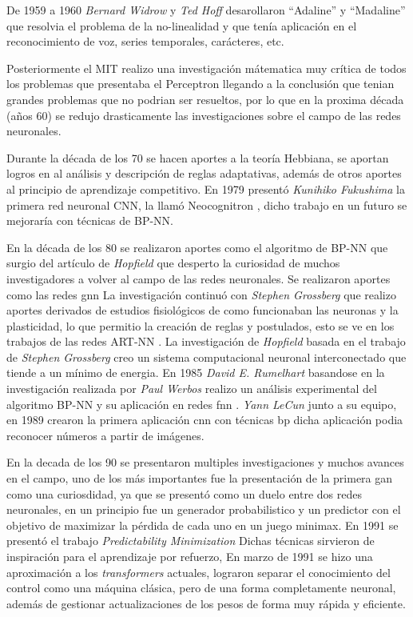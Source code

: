 De 1959 a 1960 \textit{Bernard Widrow} y \textit{Ted Hoff} desarollaron ``Adaline'' y ``Madaline'' \cite{widrow1960adaptive} que resolvia el problema de la no-linealidad y que tenía aplicación en el reconocimiento de voz, series temporales, carácteres, etc.

Posteriormente el MIT realizo una investigación mátematica muy crítica de todos los problemas que presentaba el Perceptron llegando a la conclusión que tenian grandes problemas que no podrian ser resueltos, por lo que en la proxima década (años 60) se redujo drasticamente las investigaciones sobre el campo de las redes neuronales.

Durante la década de los 70 se hacen aportes a la teoría Hebbiana, se aportan logros en al análisis y descripción de reglas adaptativas, además de otros aportes al principio de aprendizaje competitivo.
En 1979 presentó \textit{Kunihiko Fukushima} la primera red neuronal \acrshort{CNN}, la llamó Neocognitron \cite{fukushima1979neural}, dicho trabajo en un futuro se mejoraría con técnicas de \gls{BP-NN}.

En la década de los 80 se realizaron aportes como el algoritmo de \gls{BP-NN} que surgio del artículo de \textit{Hopfield} \cite{hopfield1982neural} que desperto la curiosidad de muchos investigadores a volver al campo de las redes neuronales. Se realizaron aportes como las redes \acrshort{gnn}
La investigación continuó con \textit{Stephen Grossberg} que realizo aportes derivados de estudios fisiológicos de como funcionaban las neuronas y la plasticidad, lo que permitio la creación de reglas y postulados, esto se ve en los trabajos de las redes \gls{ART-NN} \cite{grossberg1987competitive}.
La investigación de \textit{Hopfield} basada en el trabajo de \textit{Stephen Grossberg} creo un sistema computacional neuronal interconectado que tiende a un mínimo de energia.
En 1985 \textit{David E. Rumelhart} basandose en la investigación realizada por \textit{Paul Werbos} \cite{etde_5080493} realizo un análisis experimental del algoritmo \gls{BP-NN} y su aplicación en redes \acrshort{fnn} \cite{rumelhart1985learning}.
\textit{Yann LeCun} junto a su equipo, en 1989 crearon la primera aplicación \acrshort{cnn} con técnicas \acrshort{bp} dicha aplicación podia reconocer números a partir de imágenes.


En la decada de los 90 se presentaron multiples investigaciones y muchos avances en el campo, uno de los más importantes fue la presentación de la primera \acrshort{gan} como una curiosdidad, ya que se presentó como un duelo entre dos redes neuronales, en un principio fue un generador probabilistico y un predictor con el objetivo de maximizar la pérdida de cada uno en un juego minimax.
En 1991 se presentó el trabajo \textit{Predictability Minimization} \cite{urgen1991learning} Dichas técnicas sirvieron de inspiración para el aprendizaje por refuerzo,
En marzo de 1991 se hizo una aproximación a los \textit{transformers} actuales, lograron separar el conocimiento del control como una máquina clásica, pero de una forma completamente neuronal, además de gestionar actualizaciones de los pesos de forma muy rápida y eficiente.


